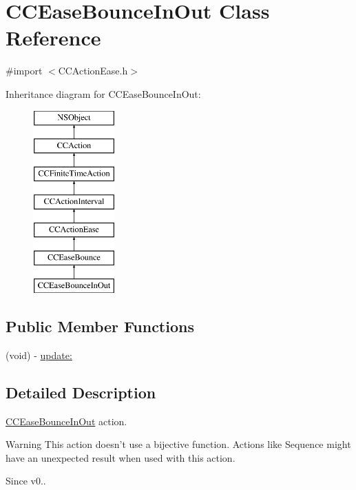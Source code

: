 \hypertarget{interface_c_c_ease_bounce_in_out}{\section{C\-C\-Ease\-Bounce\-In\-Out Class Reference}
\label{interface_c_c_ease_bounce_in_out}
}


{\ttfamily \#import $<$C\-C\-Action\-Ease.\-h$>$}

Inheritance diagram for C\-C\-Ease\-Bounce\-In\-Out\-:\begin{figure}[H]
\begin{center}
\leavevmode
\includegraphics[height=7.000000cm]{interface_c_c_ease_bounce_in_out}
\end{center}
\end{figure}
\subsection*{Public Member Functions}
\begin{DoxyCompactItemize}
\item 
(void) -\/ \hyperlink{interface_c_c_ease_bounce_in_out_a06f5153e2ebb51fdd619670fa6b9a8e7}{update\-:}
\end{DoxyCompactItemize}


\subsection{Detailed Description}
\hyperlink{interface_c_c_ease_bounce_in_out}{C\-C\-Ease\-Bounce\-In\-Out} action. \begin{DoxyWarning}{Warning}
This action doesn't use a bijective function. Actions like Sequence might have an unexpected result when used with this action. 
\end{DoxyWarning}
\begin{DoxySince}{Since}
v0.. 
\end{DoxySince}



